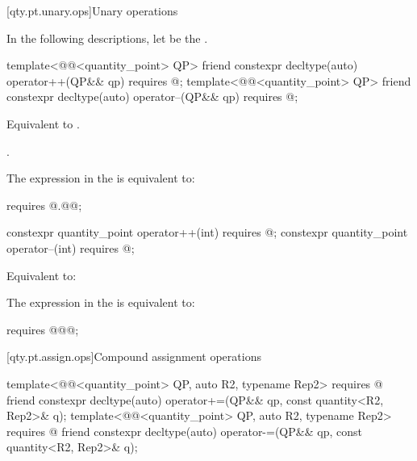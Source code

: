 [qty.pt.unary.ops]{Unary operations}

\pnum
In the following descriptions,
let  be the .

\begin{itemdecl}
template<@@<quantity_point> QP>
friend constexpr decltype(auto) operator++(QP&& qp)
  requires @\seebelownc@;
template<@@<quantity_point> QP>
friend constexpr decltype(auto) operator--(QP&& qp)
  requires @\seebelownc@;
\end{itemdecl}

\begin{itemdescr}
\pnum
\effects
Equivalent to
.

\pnum
\returns
{}.

\pnum
\remarks
The expression in the  is equivalent to:
\begin{codeblock}
requires { @\atsign@qp.@@; }
\end{codeblock}
\end{itemdescr}

\begin{itemdecl}
constexpr quantity_point operator++(int)
  requires @\seebelownc@;
constexpr quantity_point operator--(int)
  requires @\seebelownc@;
\end{itemdecl}

\begin{itemdescr}
\pnum
\effects
Equivalent to:

\pnum
\remarks
The expression in the  is equivalent to:
\begin{codeblock}
requires { @@@\atsign@; }
\end{codeblock}
\end{itemdescr}

[qty.pt.assign.ops]{Compound assignment operations}

\begin{itemdecl}
template<@@<quantity_point> QP, auto R2, typename Rep2>
  requires @\seebelownc@
friend constexpr decltype(auto) operator+=(QP&& qp, const quantity<R2, Rep2>& q);
template<@@<quantity_point> QP, auto R2, typename Rep2>
  requires @\seebelownc@
friend constexpr decltype(auto) operator-=(QP&& qp, const quantity<R2, Rep2>& q);
\end{itemdecl}

